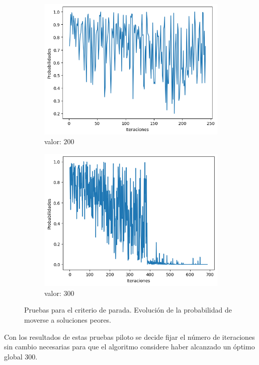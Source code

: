 \documentclass[a4paper,12pt]{article}
\begin{document}
\begin{figure}[H]
\begin{subfigure}{0.24\textwidth}
			\includegraphics[width=\textwidth]{include/parada/200/prob.png}
			\caption{valor: $200$}
		\end{subfigure}
		\hfill
		\begin{subfigure}{0.24\textwidth}
			\centering
			\includegraphics[width=\textwidth]{include/parada/300/prob.png}
			\caption{valor: $300$}
		\end{subfigure}
		\caption{Pruebas para el criterio de parada. Evolución de la probabilidad de moverse a soluciones peores.}
	\end{figure}
	
	Con los resultados de estas pruebas piloto se decide fijar el número de iteraciones sin cambio necesarias para que el algoritmo considere haber alcanzado un óptimo global $300$.
	
\end{document}
